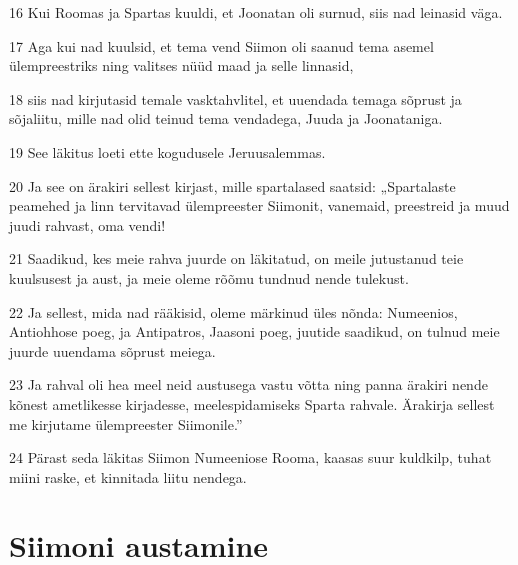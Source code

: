 \par 16 Kui Roomas ja Spartas kuuldi, et Joonatan oli surnud, siis nad leinasid väga.
\par 17 Aga kui nad kuulsid, et tema vend Siimon oli saanud tema asemel ülempreestriks ning valitses nüüd maad ja selle linnasid,
\par 18 siis nad kirjutasid temale vasktahvlitel, et uuendada temaga sõprust ja sõjaliitu, mille nad olid teinud tema vendadega, Juuda ja Joonataniga.
\par 19 See läkitus loeti ette kogudusele Jeruusalemmas.
\par 20 Ja see on ärakiri sellest kirjast, mille spartalased saatsid: „Spartalaste peamehed ja linn tervitavad ülempreester Siimonit, vanemaid, preestreid ja muud juudi rahvast, oma vendi!
\par 21 Saadikud, kes meie rahva juurde on läkitatud, on meile jutustanud teie kuulsusest ja aust, ja meie oleme rõõmu tundnud nende tulekust.
\par 22 Ja sellest, mida nad rääkisid, oleme märkinud üles nõnda: Numeenios, Antiohhose poeg, ja Antipatros, Jaasoni poeg, juutide saadikud, on tulnud meie juurde uuendama sõprust meiega.
\par 23 Ja rahval oli hea meel neid austusega vastu võtta ning panna ärakiri nende kõnest ametlikesse kirjadesse, meelespidamiseks Sparta rahvale. Ärakirja sellest me kirjutame ülempreester Siimonile.”
\par 24 Pärast seda läkitas Siimon Numeeniose Rooma, kaasas suur kuldkilp, tuhat miini raske, et kinnitada liitu nendega. 

\section*{Siimoni austamine}

